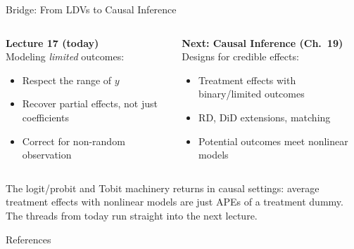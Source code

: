 \documentclass[aspectratio=169, 12pt]{beamer}
\begin{document}
\begin{frame}[shrink=12]{Bridge: From LDVs to Causal Inference}

  \begin{columns}[t]
    \begin{highlightbox}
      \textbf{Lecture 17 (today)} \\
      Modeling \emph{limited} outcomes:
      \begin{itemize}
        \item Respect the range of $y$
        \item Recover partial effects, not just coefficients
        \item Correct for non-random observation
      \end{itemize}
    \end{highlightbox}

    \begin{highlightbox}
      \textbf{Next: Causal Inference (Ch.\ 19)} \\
      Designs for credible effects:
      \begin{itemize}
        \item Treatment effects with binary/limited outcomes
        \item RD, DiD extensions, matching
        \item Potential outcomes meet nonlinear models
      \end{itemize}
    \end{highlightbox}
  \end{columns}

  \smallskip

  \begin{keybox}
    The logit/probit and Tobit machinery returns in causal settings: average
    treatment effects with nonlinear models are just APEs of a treatment dummy.
    The threads from today run straight into the next lecture.
  \end{keybox}

\end{frame}

\begin{frame}[allowframebreaks]{References}
  \footnotesize
  
\end{frame}

\end{document}
